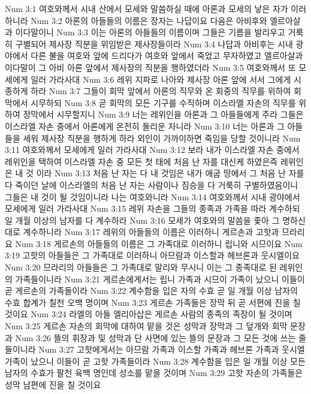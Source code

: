 Num 3:1  여호와께서 시내 산에서 모세와 말씀하실 때에 아론과 모세의 낳은 자가 이러하니라
Num 3:2  아론의 아들들의 이름은 장자는 나답이요 다음은 아비후와 엘르아살과 이다말이니
Num 3:3  이는 아론의 아들들의 이름이며 그들은 기름을 발리우고 거룩히 구별되어 제사장 직분을 위임받은 제사장들이라
Num 3:4  나답과 아비후는 시내 광야에서 다른 불을 여호와 앞에 드리다가 여호와 앞에서 죽었고 무자하였고 엘르아살과 이다말이 그 아비 아론 앞에서 제사장의 직분을 행하였더라
Num 3:5  여호와께서 또 모세에게 일러 가라사대
Num 3:6  레위 지파로 나아와 제사장 아론 앞에 서서 그에게 시종하게 하라
Num 3:7  그들이 회막 앞에서 아론의 직무와 온 회중의 직무를 위하여 회막에서 시무하되
Num 3:8  곧 회막의 모든 기구를 수직하며 이스라엘 자손의 직무를 위하여 장막에서 시무할지니
Num 3:9  너는 레위인을 아론과 그 아들들에게 주라 그들은 이스라엘 자손 중에서 아론에게 온전히 돌리운 자니라
Num 3:10  너는 아론과 그 아들들을 세워 제사장 직분을 행하게 하라 외인이 가까이하면 죽임을 당할 것이니라
Num 3:11  여호와께서 모세에게 일러 가라사대
Num 3:12  보라 내가 이스라엘 자손 중에서 레위인을 택하여 이스라엘 자손 중 모든 첫 태에 처음 난 자를 대신케 하였은즉 레위인은 내 것 이라
Num 3:13  처음 난 자는 다 내 것임은 내가 애굽 땅에서 그 처음 난 자를 다 죽이던 날에 이스라엘의 처음 난 자는 사람이나 짐승을 다 거룩히 구별하였음이니 그들은 내 것이 될 것임이니라 나는 여호와니라
Num 3:14  여호와께서 시내 광야에서 모세에게 일러 가라사대
Num 3:15  레위 자손을 그들의 종족과 가족을 따라 계수하되 일 개월 이상의 남자를 다 계수하라
Num 3:16  모세가 여호와의 말씀을 좇아 그 명하신 대로 계수하니라
Num 3:17  레위의 아들들의 이름은 이러하니 게르손과 고핫과 므라리요
Num 3:18  게르손의 아들들의 이름은 그 가족대로 이러하니 립니와 시므이요
Num 3:19  고핫의 아들들은 그 가족대로 이러하니 아므람과 이스할과 헤브론과 웃시엘이요
Num 3:20  므라리의 아들들은 그 가족대로 말리와 무시니 이는 그 종족대로 된 레위인의 가족들이니라
Num 3:21  게르손에게서는 립니 가족과 시므이 가족이 났으니 이들이 곧 게르손의 가족들이라
Num 3:22  계수함을 입은 자의 수효 곧 일 개월 이상 남자의 수효 합계가 칠천 오백 명이며
Num 3:23  게르손 가족들은 장막 뒤 곧 서편에 진을 칠 것이요
Num 3:24  라엘의 아들 엘리아삽은 게르손 사람의 종족의 족장이 될 것이며
Num 3:25  게르손 자손의 회막에 대하여 맡을 것은 성막과 장막과 그 덮개와 회막 문장과
Num 3:26  뜰의 휘장과 및 성막과 단 사면에 있는 뜰의 문장과 그 모든 것에 쓰는 줄들이니라
Num 3:27  고핫에게서는 아므람 가족과 이스할 가족과 헤브론 가족과 웃시엘 가족이 났으니 이들이 곧 고핫 가족들이라
Num 3:28  계수함을 입은 일 개월 이상 모든 남자의 수효가 팔천 육백 명인데 성소를 맡을 것이며
Num 3:29  고핫 자손의 가족들은 성막 남편에 진을 칠 것이요
